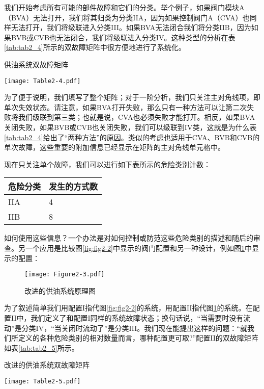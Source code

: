 \documentclass[cn,11pt,chinese]{elegantbook}
\begin{document}
我们开始考虑所有可能的部件故障和它们的分类。举个例子，如果阀门模块A（BVA）无法打开，我们将其归类为分类IIA，因为如果控制阀门A（CVA）也同样无法打开，我们将级联进入分类III。如果BVA无法闭合我们将分类IIB，因为如果BVB或CVB也无法闭合，我们将级联进入分类IV。这种类型的分析在表\ref{tab:tab2_4}所示的双故障矩阵中很方便地进行了系统化。

\begin{table}[H]
	\centering
	\caption{供油系统双故障矩阵}\label{tab:tab2_4}
	\texttt{[image: Table2-4.pdf]}
\end{table}

为了便于说明，我们填写了整个矩阵；对于一阶分析，我们只关注主对角线项，即单次失效状态。请注意，如果BVA打开失败，那么只有一种方法可以让第二次失败将我们级联到第三类；也就是说，CVA也必须失败才能打开。相反，如果BVA关闭失败，如果BVB或CVB也关闭失败，我们可以级联到IV类，这就是为什么表\ref{tab:tab2_4}给出了“两种方法”的原因。类似的考虑也适用于CVA、BVB和CVB的单次故障，这些重要的附加信息已经显示在矩阵的主对角线单元格中。

现在只关注单个故障，我们可以进行如下表所示的危险类别计数：

\begin{table}[H]
	\centering
	\begin{tabular}{@{}ll@{}}
		\toprule
		危险分类 & 发生的方式数 \\ \midrule
		IIA  & 4      \\
		IIB  & 8      \\ \bottomrule
	\end{tabular}
\end{table}

如何使用这些信息？一个办法是对如何控制或防范这些危险类别的描述和随后的审查。另一个应用是比较图\ref{fig:fig2-2}中显示的阀门配置和另一种设计，例如图\ref{fig:fig2-3}中显示的配置：

\begin{figure}[H]
	\centering
	\texttt{[image: Figure2-3.pdf]}
	\caption{改进的供油系统原理图}\label{fig:fig2-3}
\end{figure}

为了叙述简单我们用配置I指代图\ref{fig:fig2-2}的系统，用配置II指代图\ref{fig:fig2-3}的系统。在配置II中，我们定义了和配置I同样的系统故障状态；换句话说，“当需要时没有流动”是分类IV，“当关闭时流动了”是分类III。我们现在能提出这样的问题：“就我们所定义的各种危险类别的相对数量而言，哪种配置更可取?”配置II的双故障矩阵如表\ref{tab:tab2_5}所示。 

\begin{table}[h]
	\centering
	\caption{改进的供油系统双故障矩阵}\label{tab:tab2_5}
	\texttt{[image: Table2-5.pdf]}
\end{table}
\end{document}
